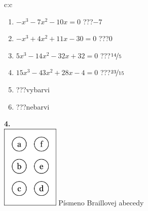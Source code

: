 \documentclass[10pt]{report}
\begin{document}
\begin{tabular}{c:c}
\begin{minipage}[c][104.5mm][t]{0.5\linewidth}
\begin{center}
\begin{minipage}{0.79\linewidth}
\begin{center}
\begin{varwidth}{\linewidth}
\begin{enumerate}
\Large
\item $-x^3-7x^2-10x=0$\quad \dotfill\; ???\;\dotfill \quad $-7$
\item $-x^3+4x^2+11x-30=0$\quad \dotfill\; ???\;\dotfill \quad $0$
\item $5x^3-14x^2-32x+32=0$\quad \dotfill\; ???\;\dotfill \quad $\nicefrac{14}{5}$
\item $15x^3-43x^2+28x-4=0$\quad \dotfill\; ???\;\dotfill \quad $\nicefrac{23}{15}$
\item \quad \dotfill\; ???\;\dotfill \quad vybarvi
\item \quad \dotfill\; ???\;\dotfill \quad nebarvi
\end{enumerate}
\end{varwidth}
\end{center}
\end{minipage}
\begin{minipage}{0.20\linewidth}
\begin{center}
{\Huge\bfseries 4.} \\[2mm]
\includegraphics[height=40mm]{../images/braille.png}
{\small Písmeno Braillovej abecedy}
\end{center}
\end{minipage}
\end{center}
\end{minipage}
%
\end{tabular}
\newpage
\thispagestyle{empty}
\end{document}
